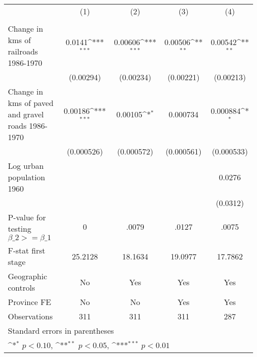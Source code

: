 {
\def\sym#1{\ifmmode^{#1}\else\(^{#1}\)\fi}
\begin{tabular}{l*{4}{c}}
\hline\hline
                &\multicolumn{1}{c}{(1)}&\multicolumn{1}{c}{(2)}&\multicolumn{1}{c}{(3)}&\multicolumn{1}{c}{(4)}\\
                &\multicolumn{1}{c}{}&\multicolumn{1}{c}{}&\multicolumn{1}{c}{}&\multicolumn{1}{c}{}\\
\hline
Change in kms of railroads 1986-1970&   0.0141\sym{***}&  0.00606\sym{***}&  0.00506\sym{**} &  0.00542\sym{**} \\
                &(0.00294)         &(0.00234)         &(0.00221)         &(0.00213)         \\
[1em]
Change in kms of paved and gravel roads 1986-1970&  0.00186\sym{***}&  0.00105\sym{*}  & 0.000734         & 0.000884\sym{*}  \\
                &(0.000526)         &(0.000572)         &(0.000561)         &(0.000533)         \\
[1em]
Log urban population 1960&                  &                  &                  &   0.0276         \\
                &                  &                  &                  & (0.0312)         \\
\hline
P-value for testing $\beta\_{2} >= \beta\_{1}$&        0         &    .0079         &    .0127         &    .0075         \\
F-stat first stage&  25.2128         &  18.1634         &  19.0977         &  17.7862         \\
Geographic controls&       No         &      Yes         &      Yes         &      Yes         \\
Province FE     &       No         &       No         &      Yes         &      Yes         \\
Observations    &      311         &      311         &      311         &      287         \\
\hline\hline
\multicolumn{5}{l}{\footnotesize Standard errors in parentheses}\\
\multicolumn{5}{l}{\footnotesize \sym{*} \(p<0.10\), \sym{**} \(p<0.05\), \sym{***} \(p<0.01\)}\\
\end{tabular}
}
